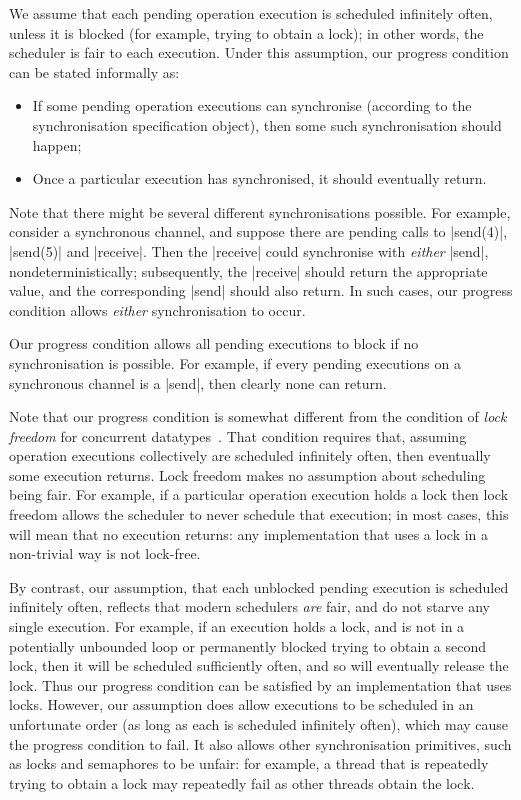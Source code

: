 We assume that each pending operation execution is scheduled infinitely often,
unless it is blocked (for example, trying to obtain a lock); in other words,
the scheduler is fair to each execution.  Under this assumption, our progress
condition can be stated informally as:
%
\begin{itemize}
\item If some pending operation executions can synchronise (according to the
  synchronisation specification object), then some such synchronisation should
  happen;

\item Once a particular execution has synchronised, it should eventually
  return.
\end{itemize}
%
Note that there might be several different synchronisations possible.  For
example, consider a synchronous channel, and suppose there are pending calls
to |send(4)|, |send(5)| and |receive|.  Then the |receive| could synchronise
with \emph{either} |send|, nondeterministically; subsequently, the |receive|
should return the appropriate value, and the corresponding |send| should also
return.  In such cases, our progress condition allows \emph{either}
synchronisation to occur.

Our progress condition allows all pending executions to block if no
synchronisation is possible.  For example, if every pending executions on a
synchronous channel is a |send|, then clearly none can return.

Note that our progress condition is somewhat different from the condition of
\emph{lock freedom} for concurrent datatypes~\cite{herlihy-shavit}.  That
condition requires that, assuming operation executions collectively are
scheduled infinitely often, then eventually some execution returns.  Lock
freedom makes no assumption about scheduling being fair.  For example, if a
particular operation execution holds a lock then lock freedom allows the
scheduler to never schedule that execution; in most cases, this will mean that
no execution returns: any implementation that uses a lock in a non-trivial way
is not lock-free.

By contrast, our assumption, that each unblocked pending execution is
scheduled infinitely often, reflects that modern schedulers \emph{are} fair,
and do not starve any single execution.  For example, if an execution holds
a lock, and is not in a potentially unbounded loop or permanently blocked
trying to obtain a second lock, then it will be scheduled sufficiently often,
and so will eventually release the lock.  Thus our progress condition can be
satisfied by an implementation that uses locks.  However, our assumption does
allow executions to be scheduled in an unfortunate order (as long as each is
scheduled infinitely often), which may cause the progress condition to fail.
It also allows other synchronisation primitives, such as locks and semaphores
to be unfair: for example, a thread that is repeatedly trying to obtain a lock
may repeatedly fail as other threads obtain the lock. 

